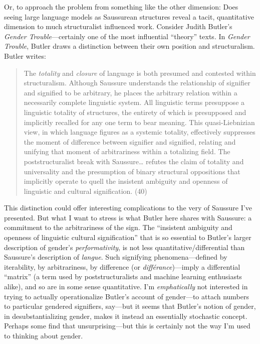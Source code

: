 \documentclass[
  12pt,
]{article}
\begin{document}
Or, to approach the problem from something like the other dimension:
Does seeing large language models as Saussurean structures reveal a
tacit, quantitative dimension to much structuralist influenced work.
Consider Judith Butler's \emph{Gender Trouble}---certainly one of the
most influential ``theory'' texts. In \emph{Gender Trouble}, Butler
draws a distinction between their own position and structuralism. Butler
writes:

\begin{quote}
The \emph{totality} and \emph{closure} of language is both presumed and
contested within structuralism. Although Saussure understands the
relationship of signifier and signified to be arbitrary, he places the
arbitrary relation within a necessarily complete linguistic system. All
linguistic terms presuppose a linguistic totality of structures, the
entirety of which is presupposed and implicitly recalled for any one
term to bear meaning. This quasi-Liebnizian view, in which language
figures as a systemic totality, effectively suppresses the moment of
difference between signifier and signified, relating and unifying that
moment of arbitrariness within a totalizing field. The poststructuralist
break with Saussure\ldots{} refutes the claim of totality and
universality and the presumption of binary structural oppositions that
implicitly operate to quell the insistent ambiguity and openness of
linguistic and cultural signification. (40)
\end{quote}

This distinction could offer interesting complications to the very of
Saussure I've presented. But what I want to stress is what Butler here
shares with Saussure: a commitment to the arbitrariness of the sign. The
``insistent ambiguity and openness of linguistic cultural
signification'' that is so essential to Butler's larger description of
gender's \emph{performativity}, is not less quantitative/differential
than Saussure's description of \emph{langue}. Such signifying
phenomena---defined by iterability, by arbitrariness, by difference (or
\emph{différance})---imply a differential ``matrix'' (a term used by
poststructuralists and machine learning enthusiasts alike), and so are
in some sense quantitative. I'm \emph{emphatically} not interested in
trying to actually operationalize Butler's account of gender---to attach
numbers to particular gendered signifiers, say---but it seems that
Butler's notion of gender, in desubstantializing gender, makes it
instead an essentially stochastic concept. Perhaps some find that
unsurprising---but this is certainly not the way I'm used to thinking
about gender.
\end{document}
